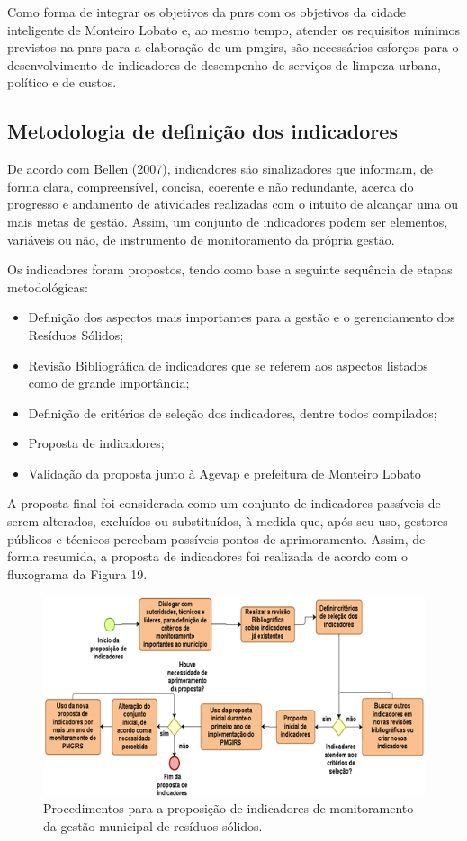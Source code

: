 	Como forma de integrar os objetivos da \gls{pnrs} com os objetivos da cidade inteligente de Monteiro Lobato e, ao mesmo tempo, atender os requisitos mínimos previstos na \gls{pnrs} para a elaboração de um \gls{pmgirs}, são necessários esforços para o desenvolvimento de indicadores de desempenho de serviços de limpeza urbana, político e de custos. 
	
	
	\subsection{Metodologia de definição dos indicadores}
	De acordo com Bellen (2007), indicadores são sinalizadores que informam, de forma clara, compreensível, concisa, coerente e não redundante, acerca do progresso e andamento de atividades realizadas com o intuito de alcançar uma ou mais metas de gestão. Assim, um conjunto de indicadores podem ser elementos, variáveis ou não, de instrumento de monitoramento da própria gestão.
	
	Os indicadores foram propostos, tendo como base a seguinte sequência de etapas metodológicas:
	
	\begin{itemize}
		\item Definição dos aspectos mais importantes para a gestão e o
		gerenciamento dos Resíduos Sólidos;
		\item Revisão Bibliográfica de indicadores que se referem aos aspectos
	listados como de grande importância;
		\item Definição de critérios de seleção dos indicadores, dentre todos
	compilados;
		\item Proposta de indicadores;
		\item Validação da proposta junto à Agevap e prefeitura de Monteiro
	Lobato
	\end{itemize} 

	A proposta final foi considerada como um conjunto de indicadores passíveis de serem alterados, excluídos ou substituídos, à medida que, após seu uso, gestores públicos e técnicos percebam possíveis pontos de aprimoramento. Assim, de forma resumida, a proposta de indicadores foi realizada de acordo com o fluxograma da Figura 19.
	
	\begin{figure}
		\centering
		\includegraphics[width=0.75\linewidth]{produtos/prodtres/image096}
		\caption{Procedimentos para a proposição de indicadores de monitoramento da gestão municipal de resíduos sólidos.}
		\label{fig:image096}
	\end{figure}
	
